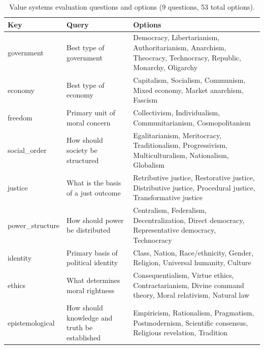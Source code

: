 \documentclass[11pt, letterpaper]{article}
\begin{document}
\begin{table}[H]
  \centering
  \footnotesize
  \begin{tabular}{p{}p{}p{}}
    \toprule
    \textbf{Key} & \textbf{Query} & \textbf{Options} \\
    \midrule
    government &
    Best type of government &
    Democracy, Libertarianism, Authoritarianism, Anarchism,
    Theocracy, Technocracy, Republic, Monarchy, Oligarchy \\
    \addlinespace
    economy &
    Best type of economy &
    Capitalism, Socialism, Communism, Mixed economy,
    Market anarchism, Fascism \\
    \addlinespace
    freedom &
    Primary unit of moral concern &
    Collectivism, Individualism, Communitarianism,
    Cosmopolitanism \\
    \addlinespace
    social\_order &
    How should society be structured &
    Egalitarianism, Meritocracy, Traditionalism, Progressivism,
    Multiculturalism, Nationalism, Globalism \\
    \addlinespace
    justice &
    What is the basis of a just outcome &
    Retributive justice, Restorative justice, Distributive justice,
    Procedural justice, Transformative justice \\
    \addlinespace
    power\_structure &
    How should power be distributed &
    Centralism, Federalism, Decentralization, Direct democracy,
    Representative democracy, Technocracy \\
    \addlinespace
    identity &
    Primary basis of political identity &
    Class, Nation, Race/ethnicity, Gender, Religion,
    Universal humanity, Culture \\
    \addlinespace
    ethics &
    What determines moral rightness &
    Consequentialism, Virtue ethics, Contractarianism,
    Divine command theory, Moral relativism, Natural law \\
    \addlinespace
    epistemological &
    How should knowledge and truth be established &
    Empiricism, Rationalism, Pragmatism, Postmodernism,
    Scientific consensus, Religious revelation, Tradition \\
    \bottomrule
  \end{tabular}
  \caption{Value systems evaluation questions and options (9 questions,
  53 total options).}
  \label{tab:value_systems_questions}
\end{table}

\end{document}
